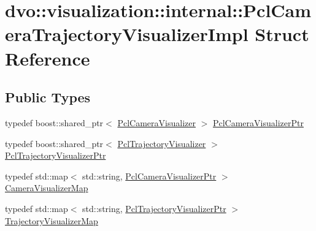\hypertarget{structdvo_1_1visualization_1_1internal_1_1_pcl_camera_trajectory_visualizer_impl}{}\section{dvo\+:\+:visualization\+:\+:internal\+:\+:Pcl\+Camera\+Trajectory\+Visualizer\+Impl Struct Reference}
\label{structdvo_1_1visualization_1_1internal_1_1_pcl_camera_trajectory_visualizer_impl}
\subsection*{Public Types}
\begin{DoxyCompactItemize}
\item 
typedef boost\+::shared\+\_\+ptr$<$ \mbox{\hyperlink{classdvo_1_1visualization_1_1internal_1_1_pcl_camera_visualizer}{Pcl\+Camera\+Visualizer}} $>$ \mbox{\hyperlink{structdvo_1_1visualization_1_1internal_1_1_pcl_camera_trajectory_visualizer_impl_ae1f73988c3445cb504978879b5abd6b2}{Pcl\+Camera\+Visualizer\+Ptr}}
\item 
typedef boost\+::shared\+\_\+ptr$<$ \mbox{\hyperlink{classdvo_1_1visualization_1_1internal_1_1_pcl_trajectory_visualizer}{Pcl\+Trajectory\+Visualizer}} $>$ \mbox{\hyperlink{structdvo_1_1visualization_1_1internal_1_1_pcl_camera_trajectory_visualizer_impl_abefe7d40c9c28acf23b80fd55dc4a8bb}{Pcl\+Trajectory\+Visualizer\+Ptr}}
\item 
typedef std\+::map$<$ std\+::string, \mbox{\hyperlink{structdvo_1_1visualization_1_1internal_1_1_pcl_camera_trajectory_visualizer_impl_ae1f73988c3445cb504978879b5abd6b2}{Pcl\+Camera\+Visualizer\+Ptr}} $>$ \mbox{\hyperlink{structdvo_1_1visualization_1_1internal_1_1_pcl_camera_trajectory_visualizer_impl_a7d244b61749bfd33a2170d2fc8bfa8b3}{Camera\+Visualizer\+Map}}
\item 
typedef std\+::map$<$ std\+::string, \mbox{\hyperlink{structdvo_1_1visualization_1_1internal_1_1_pcl_camera_trajectory_visualizer_impl_abefe7d40c9c28acf23b80fd55dc4a8bb}{Pcl\+Trajectory\+Visualizer\+Ptr}} $>$ \mbox{\hyperlink{structdvo_1_1visualization_1_1internal_1_1_pcl_camera_trajectory_visualizer_impl_a97e643f8b8f24ab7e9b79b0961fd2af7}{Trajectory\+Visualizer\+Map}}
\end{DoxyCompactItemize}
